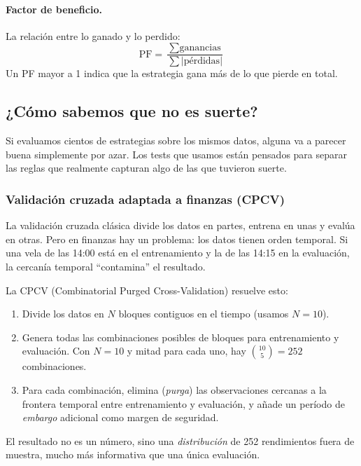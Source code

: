 \documentclass[12pt,a4paper]{article}
\begin{document}
\paragraph{Factor de beneficio.} La relación entre lo ganado y lo perdido:
\begin{equation}
\text{PF} = \frac{\sum \text{ganancias}}{\sum |\text{pérdidas}|}
\label{eq:pf}
\end{equation}
Un PF mayor a 1 indica que la estrategia gana más de lo que pierde en total.

\subsection{¿Cómo sabemos que no es suerte?}
\label{sec:validation_theory}

Si evaluamos cientos de estrategias sobre los mismos datos, alguna va a parecer buena
simplemente por azar. Los tests que usamos están pensados para separar las reglas que
realmente capturan algo de las que tuvieron suerte.

\subsubsection{Validación cruzada adaptada a finanzas (CPCV)}

La validación cruzada clásica divide los datos en partes, entrena en unas y evalúa
en otras. Pero en finanzas hay un problema: los datos tienen orden temporal. Si una
vela de las 14:00 está en el entrenamiento y la de las 14:15 en la evaluación, la
cercanía temporal ``contamina'' el resultado.

La CPCV (Combinatorial Purged Cross-Validation) resuelve esto:
\begin{enumerate}
\item Divide los datos en $N$ bloques contiguos en el tiempo (usamos $N = 10$).
\item Genera todas las combinaciones posibles de bloques para entrenamiento y
  evaluación. Con $N = 10$ y mitad para cada uno, hay $\binom{10}{5} = 252$
  combinaciones.
\item Para cada combinación, elimina (\textit{purga}) las observaciones cercanas a
  la frontera temporal entre entrenamiento y evaluación, y añade un período de
  \textit{embargo} adicional como margen de seguridad.
\end{enumerate}

El resultado no es un número, sino una \textit{distribución} de 252 rendimientos
fuera de muestra, mucho más informativa que una única evaluación.
\end{document}
